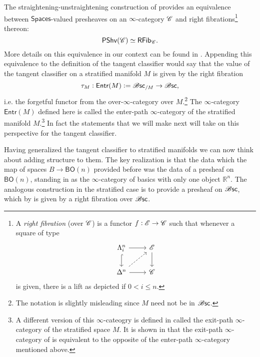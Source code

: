 \documentclass[../text]{subfiles}
\begin{document}
\begin{remark}\label{rem:grothendieck_construction}
    The straightening-unstraightening construction of \cite[§2.2]{lurie_htt} provides an equivalence between $\mathsf{Spaces}$-valued presheaves on an $\infty$-category $\mathscr{C}$ and right fibrations\footnote{A \emph{right fibration} (over $\mathscr{C}$) is a functor $f:\mathscr{E} \rightarrow \mathscr{C}$ such that whenever a square of type
    \begin{equation}
        \begin{tikzcd}[ampersand replacement=\&]
            \Lambda^n_i \arrow[r] \arrow[d, hook] \& \mathscr{E} \arrow[d] \\
            \Delta^n \arrow[r] \arrow[ru, dashed] \& \catC        
        \end{tikzcd}
    \end{equation}
    is given, there is a lift as depicted if $0 < i \leq n$.} thereon:
    \begin{equation}
        \mathsf{PShv}(\mathscr{C}) \simeq \mathsf{RFib}_{\mathscr{C}}.
    \end{equation}
    More details on this equivalence in our context can be found in \cite[§4.2]{aft_localstrut}. Appending this equivalence to the definition of the tangent classifier would say that the value of the tangent classifier on a stratified manifold $M$ is given by the right fibration
    \begin{equation}
        \tau_M: \mathsf{Entr}(M) := \mathscr{B} \mathsf{sc}_{/M} \rightarrow \mathscr{B} \mathsf{sc},
    \end{equation}
    i.e. the forgetful functor from the over-$\infty$-category over $M$.\footnote{The notation is slightly misleading since $M$ need not be in $\mathscr{B} \mathsf{sc}$.} The $\infty$-category $\mathsf{Entr}(M)$ defined here is called the enter-path $\infty$-category of the stratified manifold $M$.\footnote{A different version of this $\infty$-cateogry is defined in  called the exit-path $\infty$-category of the stratified space $M$. It is shown in \cite{afr_homhyp} that the exit-path $\infty$-category of \cite[§A.6]{lurie_ha} is equivalent to the opposite of the enter-path $\infty$-category mentioned above.} In fact the statements that we will make next will take on this perspective for the tangent classifier.
\end{remark}

Having generalized the tangent classifier to stratified manifolds we can now think about adding structure to them. The key realization is that the data which the map of spaces $B \rightarrow \mathsf{BO}(n)$ provided before was the data of a presheaf on $\mathsf{BO}(n)$, standing in as the $\infty$-category of basics with only one object $\mathbb{R}^n$. The analogous construction in the stratified case is to provide a presheaf on $\mathscr{B} \mathsf{sc}$, which by  is given by a right fibration over $\mathscr{B} \mathsf{sc}$. 
\end{document}
